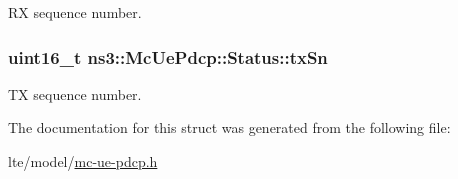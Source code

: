 RX sequence number. 

\subsubsection[{\texorpdfstring{tx\+Sn}{txSn}}]{\setlength{\rightskip}{0pt plus 5cm}uint16\+\_\+t ns3\+::\+Mc\+Ue\+Pdcp\+::\+Status\+::tx\+Sn}\hypertarget{structns3_1_1McUePdcp_1_1Status_a96787788bbdb4d675de458fe3aa3d72f}{}\label{structns3_1_1McUePdcp_1_1Status_a96787788bbdb4d675de458fe3aa3d72f}


TX sequence number. 



The documentation for this struct was generated from the following file\+:\begin{DoxyCompactItemize}
\item 
lte/model/\hyperlink{lte_2model_2mc-ue-pdcp_8h}{mc-\/ue-\/pdcp.\+h}\end{DoxyCompactItemize}
